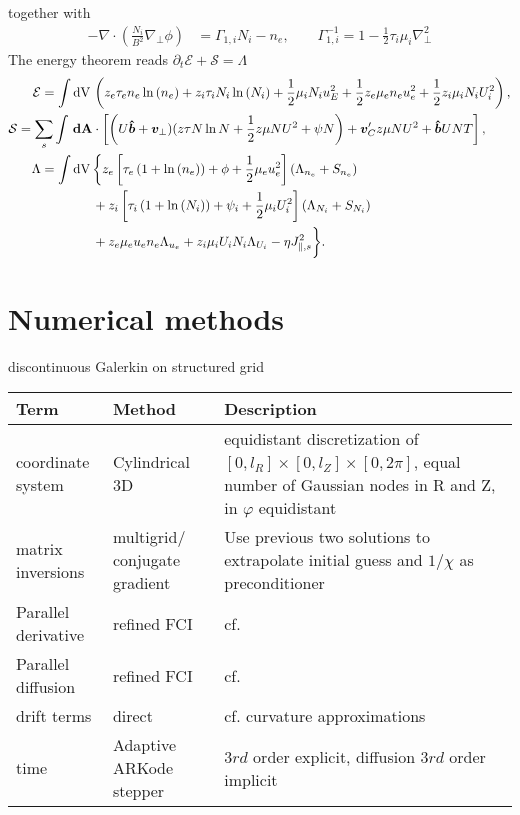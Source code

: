 together with
  \begin{align}
    -\nabla\cdot\left( \frac{N_i}{B^2}\nabla_\perp \phi \right) &= \Gamma_{1,i} N_i - n_e, \quad\quad
    \Gamma_{1,i}^{-1} = 1-\frac{1}{2}\tau_i\mu_i \nabla_\perp^2
  \end{align}
The energy theorem reads $\partial_t \mathcal E + \mathcal S = \Lambda$
\begin{align}
  \mathcal{E}= \int  \mathrm{dV}\, & \left( z_e\tau_e n_e \ln{(n_e)} +z_i\tau_i N_i\ln{(N_i)}+  \frac{1}{2} \mu_i N_i u_E^2 +\frac{1}{2} z_e\mu_e  n_e u_e^2 +\frac{1}{2} z_i\mu_i  N_i U_i^2  \right),\\
  \mathcal S = \sum_s \int {\boldsymbol{\,\mathrm{dA}}} & \cdot\left[ \left( U\bm{\hat{b}} + {\boldsymbol{v}}_\perp )
  (z\tau N\ln N + \frac{1}{2}z\mu NU^2 + \psi N \right) + {\boldsymbol{v}}_C' z\mu NU^2 + \bm{\hat{b}} UNT \right], \\
  \Lambda =  \int \mathrm{dV}\, & \bigg\{  z_e\left[\tau_e\left( 1+\ln{(n_e)}\right) + \phi + \frac{1}{2} \mu_e u_e^2 \right](\Lambda_{n_e} + S_{n_e})
  \nonumber\\ &
+z_i\left[\tau_i\left( 1+\ln{(N_i)}\right) + \psi_i + \frac{1}{2} \mu_i U_i^2 \right](\Lambda_{N_i}+S_{N_i})
\nonumber \\ &
+ z_e\mu_e u_e n_e \Lambda_{u_e}+z_i\mu_iU_i N_i \Lambda_{U_i} - \eta J_{\parallel,s}^2\bigg\}.
\end{align}

\section{Numerical methods}
discontinuous Galerkin on structured grid
\begin{longtable}{ll>{\RaggedRight}p{7cm}}
\toprule
\rowcolor{gray!50}\textbf{Term} &  \textbf{Method} & \textbf{Description}  \\ \midrule
    coordinate system & Cylindrical 3D & equidistant discretization of $[0,l_R] \times [0,l_Z] \times [0,2\pi]$, equal number of Gaussian nodes in R and Z, in $\varphi$ equidistant \\
matrix inversions & multigrid/ conjugate gradient & Use previous two solutions to extrapolate initial guess and $1/\chi$ as preconditioner \\
Parallel derivative & refined  FCI & cf.~\cite{Held2016,Stegmeir2017} \\
Parallel diffusion & refined FCI & cf.~\cite{Held2016,Stegmeir2017} \\
drift terms & direct & cf. curvature approximations \\
time & Adaptive ARKode stepper & $3rd$ order explicit, diffusion $3rd$ order implicit \\
\bottomrule
\end{longtable}

